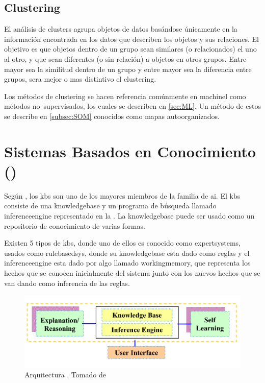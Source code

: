 \subsection{Clustering} \label{subsec:clustering}
El análisis de clusters agrupa objetos de datos basándose únicamente en la información encontrada en los datos que describen los objetos y sus relaciones. El objetivo es que objetos dentro de un grupo sean similares (o relacionados) el uno al otro, y que sean diferentes (o sin relación) a objetos en otros grupos. Entre mayor sea la similitud dentro de un grupo y entre mayor sea la diferencia entre grupos, sera mejor o mas distintivo el clustering.

Los métodos de clustering se hacen referencia comúnmente en \gls{machinel} como métodos no--supervisados, los cuales se describen en \ref{sec:ML}. Un método de estos se describe en \ref{subsec:SOM} conocidos como mapas autoorganizados.


\section{Sistemas Basados en Conocimiento ()} \label{sec:KBS}
Según \cite{sajja2010knowledge}, los \gls{kbs} son uno de los mayores miembros de la familia de \gls{ai}. El \gls{kbs} consiste de una \gls{knowledgebase} y un programa de búsqueda llamado \gls{inferenceengine} representado en la . La \gls{knowledgebase} puede ser usado como un repositorio de conocimiento de varias formas.

Existen 5 tipos de \gls{kbs}, donde uno de ellos es conocido como \gls{expertsystems}, usados como \gls{rulebasedsys}, donde su \gls{knowledgebase} esta dado como reglas y el \gls{inferenceengine} esta dado por algo llamado \gls{workingmemory}, que representa los hechos que se conocen inicialmente del sistema junto con los nuevos hechos que se van dando como inferencia de las reglas.

\begin{figure}[H]
\centering
\includegraphics[scale=0.4]{Figures/kbs-architecture.png}
\decoRule
\caption[Arquitectura ]{Arquitectura . Tomado de \cite{sajja2010knowledge} }
\label{fig:kbs-arch}
\end{figure}


